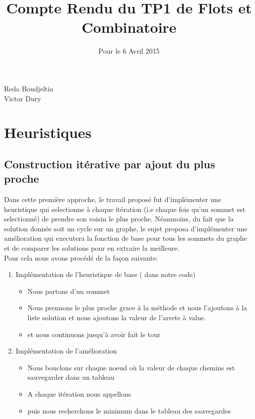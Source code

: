 \documentclass[a4paper,11pt]{article}
\begin{document}
\title{Compte Rendu du TP1 de Flots et Combinatoire}
\date{Pour le 6 Avril 2015}
\maketitle

\begin{center}
  Reda Boudjeltia \\
  Victor Dury\\
\end{center}
\maketitle
\section{Heuristiques}
\subsection{Construction itérative par ajout du plus proche}
\indent Dans cette première approche, le travail proposé fut d'implémenter une heuristique qui selectionne à chaque itération (i.e chaque fois qu'un sommet est selectionné) de prendre son voisin le plus proche. Néanmoins, du fait que la solution donnée soit un cycle sur un graphe, le sujet proposa d'implémenter une amélioration qui executera la fonction de base pour tous les sommets du graphe et de comparer les solutions pour en extraire la meilleure. \\
Pour cela nous avons procédé de la façon suivante:
\begin{enumerate}
\item Implémentation de l'heuristique de base ( dans notre code)
\begin{itemize}
\item Nous partons d'un sommet 
\item Nous prennons le plus proche grace à la méthode  et nous l'ajoutons à la liste solution et nous ajoutons la valeur de l'arrete à value.
\item et nous continuons jusqu'à avoir fait le tour
\end{itemize}
\item Implémentation de l'amélioration
\begin{itemize}
\item Nous bouclons sur chaque noeud où la valeur de chaque chemins est sauvegarder dans un tableau
\item A chaque itération nous appellons 
\item puis nous recherchons le minimum dans le tableau des sauvegardes
\end{itemize}
\end{enumerate} 
\end{document}
